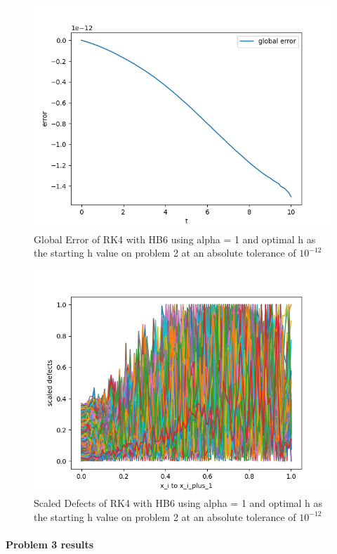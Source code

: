 \documentclass{article}
\begin{document}
\begin{figure}[H]
\centering
\includegraphics[width=0.7\linewidth]{./figures/sharp_tolerance_rk4_with_hb6_p2_global_error}
\caption{Global Error of RK4 with HB6 using alpha = 1 and optimal h as the starting h value on problem 2 at an absolute tolerance of $10^{-12}$}
\label{fig:sharp_tolerance_rk4_with_hb6_p2_global_error}
\end{figure}

\begin{figure}[H]
\centering
\includegraphics[width=0.7\linewidth]{./figures/sharp_tolerance_rk4_with_hb6_p2_scaled_defects}
\caption{Scaled Defects of RK4 with HB6 using alpha = 1 and optimal h as the starting h value on problem 2 at an absolute tolerance of $10^{-12}$}
\label{fig:sharp_tolerance_rk4_with_hb6_p2_scaled_defects}
\end{figure}

\paragraph{Problem 3 results}
\end{document}
